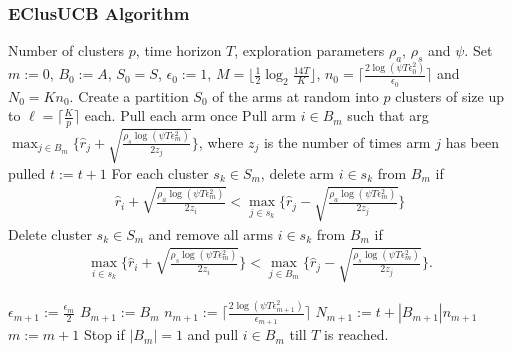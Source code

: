 \begin{frame}[allowframebreaks]
\frametitle{EClusUCB Algorithm}

\begin{algorithmic}
 Number of clusters $p$, time horizon $T$, exploration parameters $\rho_a$, $\rho_s$ and $\psi$.
 Set $m:=0$, $B_{0}:=A$, $S_0 = S$, $\epsilon_{0}:=1$, $M=\big \lfloor \frac{1}{2}\log_{2} \frac{14T}{K}\big\rfloor$, $n_{0}=\bigg\lceil\frac{2\log{(\psi T\epsilon_{0}^{2})}}{\epsilon_{0}}\bigg\rceil$ and  $N_{0}=Kn_{0}$.
\State Create a partition $S_0$ of the arms at random into $p$ clusters of size up to $\ell=\bigg\lceil \frac{K}{p} \bigg\rceil$ each.
\State Pull each arm once
\State Pull arm $i\in B_m$ such that arg$\max_{j\in B_{m}}\bigg\lbrace \hat{r}_{j} + \sqrt{\frac{\rho_{s}\log{(\psi T\epsilon_{m}^{2})}}{2 z_{j}}} \bigg\rbrace$, where $z_j$ is the number of times arm $j$ has been pulled
\State $t:=t+1$
\ArmElim
\State For each cluster $s_k \in S_{m}$, delete arm ${i}\in s_{k}$ from $B_{m}$ if
\begin{align*}
\hat{r}_{i} + \sqrt{\frac{\rho_{a}\log{(\psi T\epsilon_{m}^{2})}}{2 z_{i}}}  < \max_{{j}\in s_{k}}\bigg\lbrace\hat{r}_{j} -\sqrt{\frac{\rho_{a}\log{(\psi T\epsilon_{m}^{2})}}{2 z_{j}}} \bigg\rbrace
\end{align*}
\EndArmElim
\ClusElim
\State Delete cluster $s_{k}\in S_{m}$ and remove all arms $i\in s_{k}$ from $B_{m}$ if 
\begin{align*}
 \max_{{i}\in s_{k}}\bigg\lbrace\hat{r}_{i} + \sqrt{\frac{\rho_{s}\log{(\psi T\epsilon_{m}^{2})}}{2 z_{i}}}\bigg\rbrace 
 < \max_{{j}\in B_{m}} \bigg\lbrace\hat{r}_{j} - \sqrt{\frac{\rho_{s} \log{(\psi T\epsilon_{m}^{2})}}{2 z_{j}}}\bigg\rbrace.
\end{align*}
\EndClusElim

\State $\epsilon_{m+1}:=\frac{\epsilon_{m}}{2}$\vspace{0.5ex}
\State $B_{m+1}:=B_{m}$
\State $n_{m+1}:=\bigg\lceil\frac{2\log{(\psi T\epsilon_{m+1}^{2})}}{\epsilon_{m+1}}\bigg\rceil$
\State $N_{m+1}:=t+|B_{m+1}| n_{m+1}$
\State $m:=m+1$
\State Stop if $|B_{m}|=1$ and pull ${i}\in B_{m}$ till $T$ is reached.
\EndIf
\EndFor
\end{algorithmic}

\end{frame}

